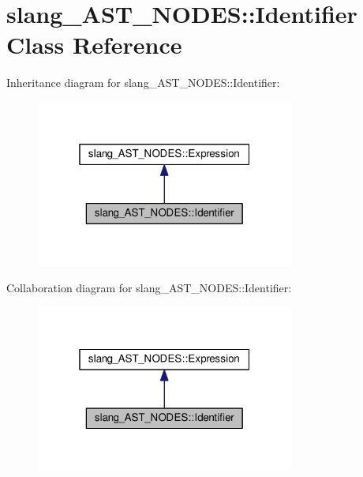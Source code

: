 \hypertarget{classslang__AST__NODES_1_1Identifier}{}\section{slang\+\_\+\+A\+S\+T\+\_\+\+N\+O\+D\+ES\+:\+:Identifier Class Reference}
\label{classslang__AST__NODES_1_1Identifier}


Inheritance diagram for slang\+\_\+\+A\+S\+T\+\_\+\+N\+O\+D\+ES\+:\+:Identifier\+:
\nopagebreak
\begin{figure}[H]
\begin{center}
\leavevmode
\includegraphics[width=241pt]{classslang__AST__NODES_1_1Identifier__inherit__graph}
\end{center}
\end{figure}


Collaboration diagram for slang\+\_\+\+A\+S\+T\+\_\+\+N\+O\+D\+ES\+:\+:Identifier\+:
\nopagebreak
\begin{figure}[H]
\begin{center}
\leavevmode
\includegraphics[width=241pt]{classslang__AST__NODES_1_1Identifier__coll__graph}
\end{center}
\end{figure}
